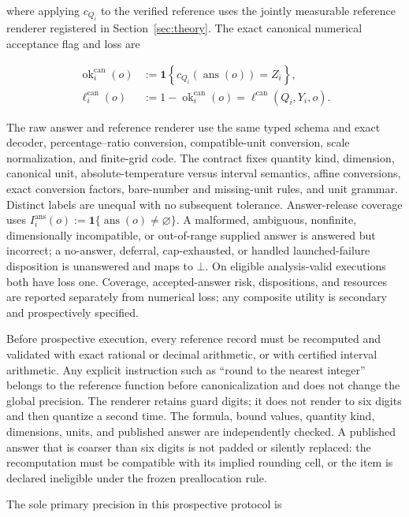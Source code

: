 \documentclass[10pt]{article} %
\providecommand{\1}{\mathbf{1}}  %
\theoremstyle{remark}
\theoremstyle{definition}
\begin{document}
where applying $c_{Q_i}$ to the verified reference uses the jointly measurable reference renderer registered in Section~\ref{sec:theory}. The exact canonical numerical acceptance flag and loss are

\begin{align}
\operatorname{ok}^{\mathrm{can}}_i(o)
&:=
\mathbf 1\!\left\{
c_{Q_i}\!\left(\operatorname{ans}(o)\right)=Z_i
\right\},
\label{eq:pilot-adjudication-predicate}
\\
\ell_i^{\mathrm{can}}(o)
&:=
1-\operatorname{ok}^{\mathrm{can}}_i(o)
=
\ell^{\mathrm{can}}(Q_i,Y_i,o).
\label{eq:pilot-item-loss}
\end{align}

The raw answer and reference renderer use the same typed schema and exact
decoder, percentage--ratio conversion, compatible-unit conversion, scale
normalization, and finite-grid code. The contract fixes quantity kind,
dimension, canonical unit, absolute-temperature versus interval semantics,
affine conversions, exact conversion factors, bare-number and missing-unit
rules, and unit grammar. Distinct labels are unequal with no subsequent
tolerance. Answer-release coverage uses
$I_i^{\mathrm{ans}}(o):=\mathbf 1\{\operatorname{ans}(o)\neq\varnothing\}$.
A malformed, ambiguous, nonfinite, dimensionally incompatible, or out-of-range
supplied answer is answered but incorrect; a no-answer, deferral,
cap-exhausted, or handled launched-failure disposition is unanswered and
maps to $\bot$. On eligible analysis-valid executions both have loss one.
Coverage, accepted-answer
risk, dispositions, and resources are reported separately from numerical
loss; any composite utility is secondary and prospectively specified.

Before prospective execution, every reference record must be recomputed and validated with exact rational or decimal arithmetic, or with certified interval arithmetic. Any explicit instruction such as ``round to the nearest integer'' belongs to the reference function before canonicalization and does not change the global precision. The renderer retains guard digits; it does not render to six digits and then quantize a second time. The formula, bound values, quantity kind, dimensions, units, and published answer are independently checked. A published answer that is coarser than six digits is not padded or silently replaced: the recomputation must be compatible with its implied rounding cell, or the item is declared ineligible under the frozen preallocation rule.

The sole primary precision in this prospective protocol is
\end{document}
